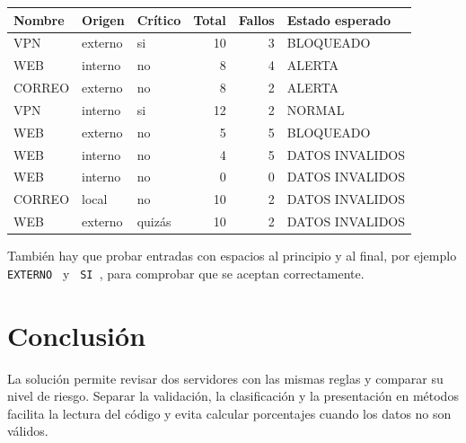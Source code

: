 \documentclass[12pt,a4paper]{article}
\begin{document}
\begin{center}
\begin{tabular}{|l|l|l|r|r|l|}
\hline
Nombre & Origen & Crítico & Total & Fallos & Estado esperado \\
\hline
VPN & externo & si & 10 & 3 & BLOQUEADO \\
WEB & interno & no & 8 & 4 & ALERTA \\
CORREO & externo & no & 8 & 2 & ALERTA \\
VPN & interno & si & 12 & 2 & NORMAL \\
WEB & externo & no & 5 & 5 & BLOQUEADO \\
WEB & interno & no & 4 & 5 & DATOS INVALIDOS \\
WEB & interno & no & 0 & 0 & DATOS INVALIDOS \\
CORREO & local & no & 10 & 2 & DATOS INVALIDOS \\
WEB & externo & quizás & 10 & 2 & DATOS INVALIDOS \\
\hline
\end{tabular}
\end{center}

También hay que probar entradas con espacios al principio y al final,
por ejemplo \texttt{ EXTERNO } y \texttt{ SI }, para comprobar que se
aceptan correctamente.

\section{Conclusión}
La solución permite revisar dos servidores con las mismas reglas y
comparar su nivel de riesgo. Separar la validación, la clasificación y
la presentación en métodos facilita la lectura del código y evita
calcular porcentajes cuando los datos no son válidos.
\end{document}

